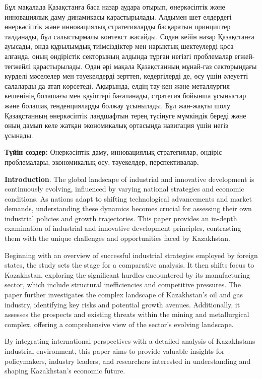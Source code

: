 \begin{multicols}{2}
Бұл мақалада Қазақстанға баса назар аудара отырып, өнеркәсіптік және
инновациялық даму динамикасы қарастырылады. Алдымен шет елдердегі
өнеркәсіптік және инновациялық стратегияларды басқаратын принциптер
талданады, бұл салыстырмалы контекст жасайды. Содан кейін назар
Қазақстанға ауысады, онда құрылымдық тиімсіздіктер мен нарықтық
шектеулерді қоса алғанда, оның өндірістік секторының алдында тұрған
негізгі проблемалар егжей-тегжейлі қарастырылады. Одан әрі мақала
Қазақстанның мұнай-газ секторындағы күрделі мәселелер мен тәуекелдерді
зерттеп, кедергілерді де, өсу үшін әлеуетті салаларды да атап көрсетеді.
Ақырында, елдің тау-кен және металлургия кешенінің болашағы мен
қауіптері бағаланады, стратегия бойынша ұсыныстар және болашақ
тенденцияларды болжау ұсынылады. Бұл жан-жақты шолу Қазақстанның
өнеркәсіптік ландшафтын терең түсінуге мүмкіндік береді және оның дамып
келе жатқан экономикалық ортасында навигация үшін негіз ұсынады.

{\bfseries Түйін сөздер:} Өнеркәсіптік даму, инновациялық стратегиялар,
өндіріс проблемалары, экономикалық өсу, тәуекелдер,
перспективалар{\bfseries .}

{\bfseries Introduction}. The global landscape of industrial and innovative
development is continuously evolving, influenced by varying national
strategies and economic conditions. As nations adapt to shifting
technological advancements and market demands, understanding these
dynamics becomes crucial for assessing their own industrial policies and
growth trajectories. This paper provides an in-depth examination of
industrial and innovative development principles, contrasting them with
the unique challenges and opportunities faced by Kazakhstan.

Beginning with an overview of successful industrial strategies employed
by foreign states, the study sets the stage for a comparative analysis.
It then shifts focus to Kazakhstan, exploring the significant hurdles
encountered by its manufacturing sector, which include structural
inefficiencies and competitive pressures. The paper further investigates
the complex landscape of Kazakhstan's oil and gas industry, identifying
key risks and potential growth avenues. Additionally, it assesses the
prospects and existing threats within the mining and metallurgical
complex, offering a comprehensive view of the sector's evolving
landscape.

By integrating international perspectives with a detailed analysis of
Kazakhstan\textquotesingle s industrial environment, this paper aims to
provide valuable insights for policymakers, industry leaders, and
researchers interested in understanding and shaping Kazakhstan's
economic future.


\end{multicols}
